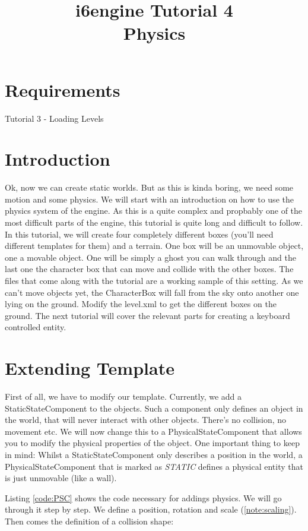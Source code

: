 \documentclass{article}
\title{i6engine Tutorial 4 \\ Physics}
\begin{document}
\section{Requirements}

Tutorial 3 - Loading Levels

\section{Introduction}

Ok, now we can create static worlds. But as this is kinda boring, we need some motion and some physics. We will start with an introduction on how to use the physics system of the engine. As this is a quite complex and propbably one of the most difficult parts of the engine, this tutorial is quite long and difficult to follow.\newline
In this tutorial, we will create four completely different boxes (you'll need different templates for them) and a terrain. One box will be an unmovable object, one a movable object. One will be simply a ghost you can walk through and the last one the character box that can move and collide with the other boxes. The files that come along with the tutorial are a working sample of this setting. As we can't move objects yet, the CharacterBox will fall from the sky onto another one lying on the ground. Modify the level.xml to get the different boxes on the ground. The next tutorial will cover the relevant parts for creating a keyboard controlled entity.

\section{Extending Template}

First of all, we have to modify our template. Currently, we add a StaticStateComponent to the objects. Such a component only defines an object in the world, that will never interact with other objects. There's no collision, no movement etc. We will now change this to a PhysicalStateComponent that allows you to modify the physical properties of the object. One important thing to keep in mind: Whilst a StaticStateComponent only describes a position in the world, a PhysicalStateComponent that is marked as \textit{STATIC} defines a physical entity that is just unmovable (like a wall).\newline

Listing \ref{code:PSC} shows the code necessary for addings physics. We will go through it step by step.\newline
We define a position, rotation and scale (\ref{note:scaling}). Then comes the definition of a collision shape:
\end{document}
